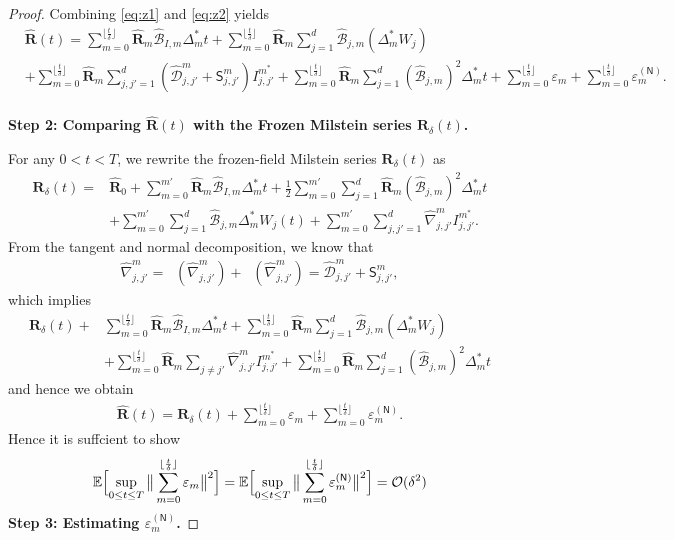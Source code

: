 \documentclass[11pt, a4paper, onecolumn]{article}
\newcommand{\E}{\mathbb{E}}
\renewcommand{\SS}{\mathsf{S}}
\newcommand{\m}{m}
\newcommand{\bfR}{\mathbf{R}}
\newcommand{\B}{\mathcal{B}}
\newcommand{\hatB}{\widehat{\B}}
\newcommand{\hatR}{\widehat{\bfR}}
\newcommand{\hatD}{\widehat{\tg D}}
\renewcommand{\bf}[1]{\mathbf{#1}}
\newcommand{\tg}[1]{\mathcal{#1}}
\newcommand{\nm}[1]{\mathsf{#1}}
\newcommand{\calO}{\mathcal{O}}
\newcommand{\ms}{{m^*}}
\newcommand{\hBIms}{{\hatB_{I,\m}}}
\newcommand{\hBjms}{{\hatB_{j,\m}}}
\newcommand{\Dms}{{\Delta^{*}_{m}}}
\newcommand{\hDjjpms}{ {\hatD_{j,j'}^{\m}} }
\newcommand{\hnjjpms}{ {\widehat{\nabla}_{j,j'}^{\m}} }
\newcommand{\Ijjpms}{ {I_{j,j'}^{\ms}} }
\newcommand{\sumub}{{\lfloor \frac{t}{\delta} \rfloor}}
\newcommand{\half}{{\frac{1}{2}}}
\newcommand{\hRms}{{\hatR_\m}}
\newcommand{\ermn}[1]{\varepsilon_m^{(#1)}}
\DeclareMathOperator{\POtg}{\Pi^O_{T_{\bf R}}}
\DeclareMathOperator{\POnm}{\Pi^O_{N_{\bf R}}}
\newcommand{\EsupN}[1]{\E\Bigl[ \sup_{0 \le t\le T} \big\| \sum_{m=0}^{\sumub} #1 \big\|^2 \Bigr]}
\begin{document}
\begin{appendices}
\begin{proof}
Combining \cref{eq:z1} and \cref{eq:z2} yields
\begin{align*}
    & \hatR(t) =  \sum_{m=0}^{\sumub} \hRms \hBIms \Dms t + \sum_{m=0}^{\sumub} \hRms \sum_{j=1}^d\hBjms (\Dms W_j) \\
                & + \sum_{m=0}^{\sumub} \hRms \sum_{j,j'=1}^d \left(\hDjjpms + \SS_{j,j'}^m\right) \Ijjpms + \sum_{m=0}^{\sumub} \hRms \sum_{j=1}^d (\hBjms)^2 \Dms t + \sum_{m=0}^{\sumub} \varepsilon_m + \sum_{m=0}^{\sumub} \ermn{\nm N}.
\end{align*}
\\

\noindent\textbf{Step 2: Comparing $\hatR(t)$ with the Frozen Milstein series $\bfR_\delta(t)$.}


For any $ 0 < t < T$, we rewrite the frozen-field Milstein series $\bfR_\delta(t)$ as
\begin{align*}
    \bfR_\delta(t) = & \hatR_0 + \sum_{m=0}^{m'} \hRms \hBIms \Dms t +  \half \sum_{m=0}^{m'}  \sum_{j=1}^d \hRms (\hBjms)^2 \Dms t \\
    & + \sum_{m=0}^{m'}  \sum_{j=1}^d \hBjms \Dms W_j(t) +  \sum_{m=0}^{m'}  \sum_{j,j'=1}^d \hnjjpms \Ijjpms.
\end{align*}
From the tangent and normal decomposition, we know that
\begin{align*}
     \hnjjpms = \POtg(\hnjjpms)+\POnm(\hnjjpms)  =\hDjjpms + \SS_{j,j'}^m,
\end{align*}
which implies
\begin{align*}
    \bfR_\delta(t) +& \sum_{m=0}^{\sumub} \hRms \hBIms \Dms t + \sum_{m=0}^{\sumub} \hRms \sum_{j=1}^d\hBjms (\Dms W_j) \\
    & +\sum_{m=0}^{\sumub} \hRms \sum_{j \neq j'} \hnjjpms \Ijjpms + \sum_{m=0}^{\sumub} \hRms \sum_{j=1}^d (\hBjms)^2 \Dms t 
\end{align*}
and hence we obtain
\begin{align}\label{eq:app-B-combine-1}
     \hatR(t)  =  \bfR_\delta(t) +  \sum_{m=0}^{\sumub} \varepsilon_m + \sum_{m=0}^{\sumub} \ermn{\nm N}.
\end{align}
Hence it is suffcient to show
\begin{align*}
    \EsupN{\varepsilon_m } = \EsupN{\ermn{\nm N}} = \calO(\delta^2)
\end{align*}
\noindent\textbf{Step 3: Estimating  $\ermn{\nm N}$.}



\end{proof}
\end{appendices}
\end{document}
